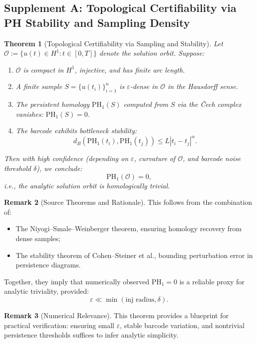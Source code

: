 \documentclass[11pt]{article}
\newtheorem{theorem}{Theorem}[section]
\theoremstyle{definition}
\newtheorem{remark}[theorem]{Remark}
\begin{document}
\subsection*{Supplement A: Topological Certifiability via PH Stability and Sampling Density}

\begin{theorem}[Topological Certifiability via Sampling and Stability]
\label{thm:certifiability}
Let $\mathcal{O} := \{ u(t) \in H^1 : t \in [0,T] \}$ denote the solution orbit. Suppose:
\begin{enumerate}
    \item $\mathcal{O}$ is compact in $H^1$, injective, and has finite arc length.
    \item A finite sample $S = \{ u(t_i) \}_{i=1}^n$ is $\varepsilon$-dense in $\mathcal{O}$ in the Hausdorff sense.
    \item The persistent homology $\mathrm{PH}_1(S)$ computed from $S$ via the Čech complex vanishes: $\mathrm{PH}_1(S) = 0$.
    \item The barcode exhibits bottleneck stability:
    \[
    d_B(\mathrm{PH}_1(t_i), \mathrm{PH}_1(t_j)) \leq L|t_i - t_j|^\alpha.
    \]
\end{enumerate}
Then with high confidence (depending on $\varepsilon$, curvature of $\mathcal{O}$, and barcode noise threshold $\delta$), we conclude:
\[
\mathrm{PH}_1(\mathcal{O}) = 0,
\]
i.e., the analytic solution orbit is homologically trivial.
\end{theorem}

\begin{remark}[Source Theorems and Rationale]
This follows from the combination of:
\begin{itemize}
    \item The Niyogi–Smale–Weinberger theorem, ensuring homology recovery from dense samples;
    \item The stability theorem of Cohen–Steiner et al., bounding perturbation error in persistence diagrams.
\end{itemize}
Together, they imply that numerically observed $\mathrm{PH}_1 = 0$ is a reliable proxy for analytic triviality, provided:
\[
\varepsilon \ll \min(\text{inj radius}, \delta).
\]
\end{remark}

\begin{remark}[Numerical Relevance]
This theorem provides a blueprint for practical verification: ensuring small $\varepsilon$, stable barcode variation, and nontrivial persistence thresholds suffices to infer analytic simplicity.
\end{remark}
\end{document}
